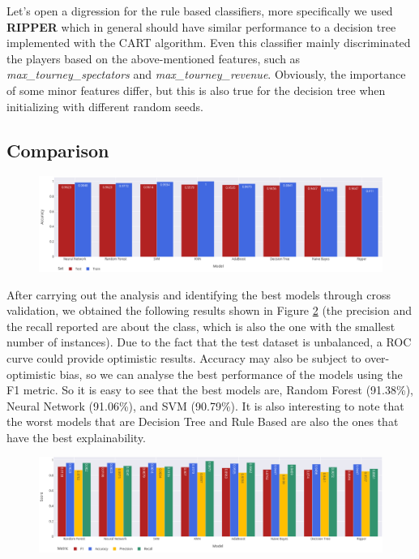 Let's open a digression for the rule based classifiers, more specifically we used \textbf{RIPPER} which in general should have similar performance to a decision tree implemented with the CART algorithm. Even this classifier mainly discriminated the players based on the above-mentioned features, such as \textit{max\_tourney\_spectators} and \textit{max\_tourney\_revenue}. Obviously, the importance of some minor features differ, but this is also true for the decision tree when initializing with different random seeds.\\

\subsection{Comparison}
\begin{figure}[h]
	\centering
	\includegraphics[width=\textwidth]{plots/classification/accuracy.png}
	\label{fig:accuracy}
\end{figure}
After carrying out the analysis and identifying the best models through cross validation, we obtained the following results shown in Figure \ref{fig:test_metrics} (the precision and the recall reported are about the  class, which is also the one with the smallest number of instances). Due to the fact that the test dataset is unbalanced, a ROC curve could provide optimistic results. Accuracy may also be subject to over-optimistic bias, so we can analyse the best performance of the models using the F1 metric. So it is easy to see that the best models are, Random Forest (91.38\%), Neural Network (91.06\%), and SVM (90.79\%). It is also interesting to note that the worst models that are Decision Tree and Rule Based are also the ones that have the best explainability.

\begin{figure}[h]
	\centering
	\includegraphics[width=\textwidth]{plots/classification/test_metrics.png}
	\label{fig:test_metrics}
\end{figure}

